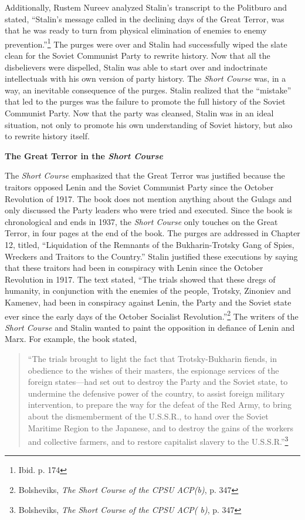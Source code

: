 \documentclass[a4paper, twocolumn]{article}
\begin{document}
Additionally, Rustem Nureev analyzed Stalin's transcript to the
Politburo and stated, ``Stalin's message called in the declining days
of the Great Terror, was that he was ready to turn from physical
elimination of enemies to enemy prevention.''\footnote{Ibid. p. 174} The purges were over
and Stalin had successfully wiped the slate clean for the Soviet Communist
Party to rewrite history. Now that all the disbelievers were dispelled, Stalin was able
to start over and indoctrinate intellectuals with his own version of
party history. The \emph{Short Course} was, in a way, an inevitable
consequence of the purges. Stalin realized that the ``mistake'' that led
to the purges was the failure to promote the full history of the
Soviet Communist Party. Now that the party was cleansed, Stalin was in an
ideal situation, not only to promote his own understanding of Soviet
history, but also to rewrite history itself.


\begin{center}\textbf{The Great Terror in the \emph{Short Course}}\end{center}

	The \emph{Short Course} emphasized that the Great Terror was justified
    because the traitors opposed Lenin and the Soviet Communist Party since
    the October Revolution of 1917. The book does not mention anything about
    the Gulags and only discussed the Party leaders who were tried and
    executed. Since the book is chronological and ends in 1937, the
    \emph{Short Course} only touches on the Great Terror, in four pages at
    the end of the book. The purges are addressed in Chapter 12,
    titled, ``Liquidation of the Remnants of the Bukharin-Trotsky Gang
    of Spies, Wreckers and Traitors to the Country.'' Stalin justified
    these executions by saying that these traitors had been in
    conspiracy with Lenin since the October Revolution in 1917. The
    text stated, ``The trials showed that these dregs of humanity, in
    conjunction with the enemies of the people, Trotsky, Zinoniev and
    Kamenev, had been in conspiracy against Lenin, the Party and the
    Soviet state ever since the early days of the October Socialist
    Revolution.''\footnote{Bolsheviks, \emph{The Short Course of the CPSU ACP(b)}, p. 347} The writers of the \emph{Short Course} and Stalin wanted
    to paint the opposition in defiance of Lenin and Marx. For
    example, the book stated,

\begin{quote}
``The trials brought to light the fact that Trotsky-Bukharin fiends, in
obedience to the wishes of their masters, the espionage services of the
foreign states—had set out to destroy the Party and the Soviet state,
to undermine the defensive power of the country, to assist foreign
military intervention, to prepare the way for the defeat of the Red
Army, to bring about the dismemberment of the U.S.S.R., to hand over
the Soviet Maritime Region to the Japanese, and to destroy the gains
of the workers and collective farmers, and to restore capitalist
slavery to the U.S.S.R.''\footnote{Bolsheviks, \emph{The Short Course of the CPSU ACP( b)}, p. 347}
\end{quote}
\end{document}
